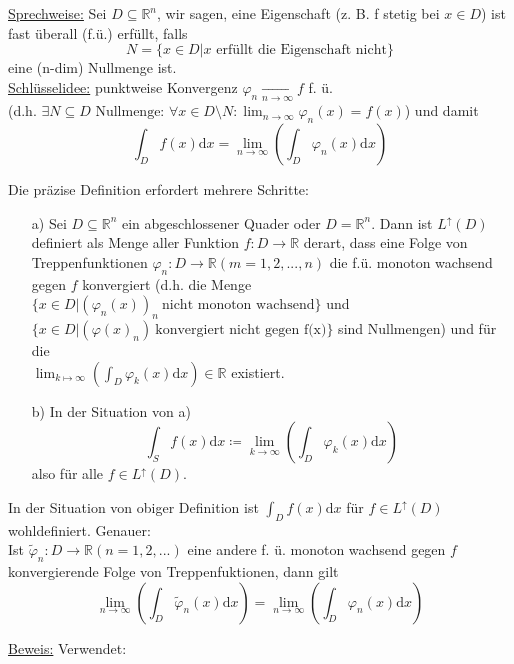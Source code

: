 \underline{Sprechweise:} Sei $D \subseteq \mathbb{R}^n$, wir sagen, eine Eigenschaft (z. B. f stetig bei $x \in D$) ist fast überall (f.ü.) erfüllt, falls
\[N=\{x \in D | x \text{ erfüllt die Eigenschaft nicht}\}\]
eine (n-dim) Nullmenge ist.\\

\underline{Schlüsselidee:} punktweise Konvergenz $\varphi_n \xrightarrow[n \to \infty]{}f$ f. ü.\\
(d.h. $\exists N \subseteq D \text{ Nullmenge: } \forall x \in D \setminus N \colon \lim_{n \to \infty} \varphi_n(x)=f(x)$) und damit
\[\int_D f(x) \text{d}x = \lim_{n \to \infty} \left(\int_D \varphi_n(x) \text{d}x\right)\]

Die präzise Definition erfordert mehrere Schritte:

\begin{definition}\leavevmode
	\begin{itemize}
		\item[a)] Sei $D \subseteq \mathbb{R}^n$ ein abgeschlossener Quader oder $D = \mathbb{R}^n$. Dann ist $L^\uparrow(D)$ definiert als Menge aller Funktion $f \colon D \to \mathbb{R}$ derart, dass eine Folge von Treppenfunktionen $\varphi_n \colon D \to \mathbb{R} (m=1,2,...,n)$ die f.ü. monoton wachsend gegen $f$ konvergiert (d.h. die Menge $\{x \in D | (\varphi_n(x))_n\ \text{nicht monoton wachsend}\}$ und $\{x \in D | (\varphi(x)_n)\ \text{konvergiert nicht gegen f(x)}\}$ sind Nullmengen) und für die\\
		      $\lim_{k \mapsto \infty} (\int_D \varphi_k(x) \text{d}x) \in \mathbb{R}$ existiert.
		\item[b)]  In der Situation von a)
		      \[\int_S f(x) \text{d}x \coloneqq \lim_{k \to \infty} \left(\int_D \varphi_k(x) \text{d}x \right)\]
		      also für alle $f \in L^\uparrow(D)$.
	\end{itemize}
\end{definition}

\begin{proposition}
	In der Situation von obiger Definition ist $\int_D f(x) \text{d}x$ für $f\in L^\uparrow(D)$ wohldefiniert. Genauer:\\
	Ist $\tilde{\varphi}_n \colon D \to \mathbb{R} (n=1,2,...)$ eine andere f. ü. monoton wachsend gegen $f$ konvergierende Folge von Treppenfuktionen, dann gilt
	\[\lim_{n \to \infty} \left(\int_D \tilde{\varphi}_n (x) \text{d}x\right) = \lim_{n \to \infty} \left(\int_D \varphi_n(x) \text{d}x\right)\]
\end{proposition}
\underline{Beweis:}
Verwendet:
